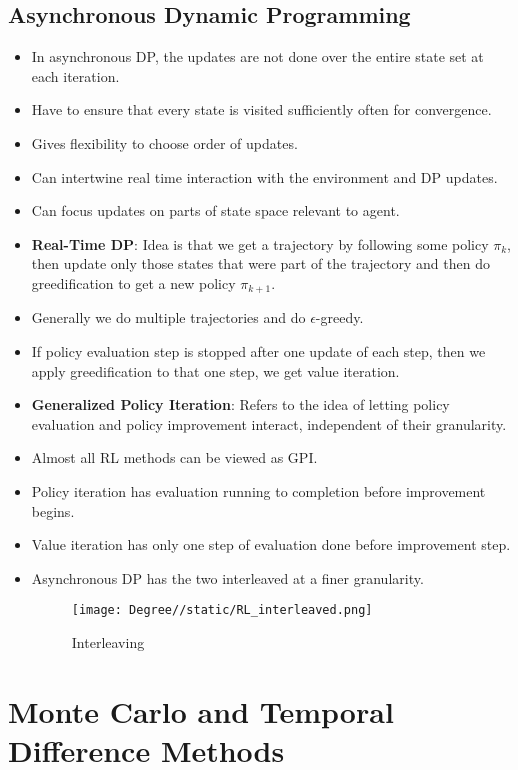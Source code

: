 \documentclass[a4paper]{article}
\begin{document}
\subsection{Asynchronous Dynamic Programming}
\begin{itemize}
    \item In asynchronous DP, the updates are not done over the entire state set at each iteration.
    \item Have to ensure that every state is visited sufficiently often for convergence.
    \item Gives flexibility to choose order of updates.
    \item Can intertwine real time interaction with the environment and DP updates.
    \item Can focus updates on parts of state space relevant to agent.
    \item \textbf{Real-Time DP}: Idea is that we get a trajectory by following some policy $\pi_k$, then update only those states that were part of the trajectory and then do greedification to get a new policy $\pi_{k+1}$.
    \item Generally we do multiple trajectories and do $\epsilon$-greedy.
    \item If policy evaluation step is stopped after one update of each step, then we apply greedification to that one step, we get value iteration.
    \item \textbf{Generalized Policy Iteration}: Refers to the idea of letting policy evaluation and policy improvement interact, independent of their granularity.
    \item Almost all RL methods can be viewed as GPI.
    \item Policy iteration has evaluation running to completion before improvement begins.
    \item Value iteration has only one step of evaluation done before improvement step.
    \item Asynchronous DP has the two interleaved at a finer granularity.
    \begin{figure}[H]
        \centering
        \texttt{[image: Degree//static/RL\_interleaved.png]}
        \caption{Interleaving}
    \end{figure}
\end{itemize}

\section{Monte Carlo and Temporal Difference Methods}
\end{document}
